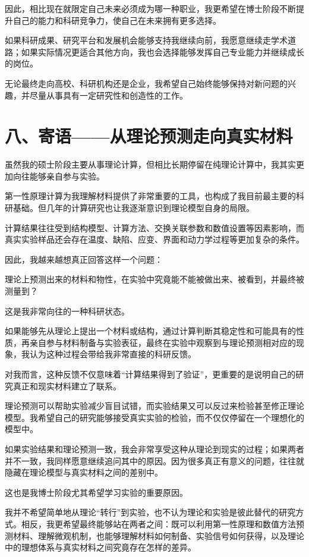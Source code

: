 因此，相比现在就限定自己未来必须成为哪一种职业，我更希望在博士阶段不断提升自己的能力和科研竞争力，使自己在未来拥有更多选择。

如果科研成果、研究平台和发展机会能够支持我继续向前，我愿意继续走学术道路；如果实际情况更适合其他方向，我也会选择能够发挥自己专业能力并继续成长的岗位。

无论最终走向高校、科研机构还是企业，我希望自己始终能够保持对新问题的兴趣，并尽量从事具有一定研究性和创造性的工作。

\section{八、寄语——从理论预测走向真实材料}

虽然我的硕士阶段主要从事理论计算，但相比长期停留在纯理论计算中，我其实更加向往能够亲自参与实验。

第一性原理计算为我理解材料提供了非常重要的工具，也构成了我目前最主要的科研基础。但几年的计算研究也让我逐渐意识到理论模型自身的局限。

计算结果往往受到结构模型、计算方法、交换关联参数和数值设置等因素影响，而真实实验样品还会存在温度、缺陷、应变、界面和动力学过程等更加复杂的条件。

因此，我越来越想真正回答这样一个问题：

理论上预测出来的材料和物性，在实验中究竟能不能被做出来、被看到，并最终被测量到？

这是我非常向往的一种科研状态。

如果能够先从理论上提出一个材料或结构，通过计算判断其稳定性和可能具有的性质，再亲自参与材料制备与实验表征，最终在实验中观察到与理论预测相对应的现象，我认为这种过程会带给我非常直接的科研反馈。

对我而言，这种反馈不仅意味着“计算结果得到了验证”，更重要的是说明自己的研究真正和现实材料建立了联系。

理论预测可以帮助实验减少盲目试错，而实验结果又可以反过来检验甚至修正理论模型。我希望自己的研究能够接受真实实验的检验，而不仅仅停留在一个理想化的模型中。

如果实验结果和理论预测一致，我会非常享受这种从理论到现实的过程；如果两者并不一致，我同样愿意继续追问其中的原因。因为很多真正有意义的问题，往往就隐藏在理论模型与真实材料之间的差别中。

这也是我博士阶段尤其希望学习实验的重要原因。

我并不希望简单地从理论“转行”到实验，也不认为理论和实验是彼此替代的研究方式。相反，我更希望最终能够站在两者之间：既可以利用第一性原理和数值方法预测材料、理解微观机制，也能够理解材料如何制备、实验信号如何获得，以及理论中的理想体系与真实材料之间究竟存在怎样的差异。


